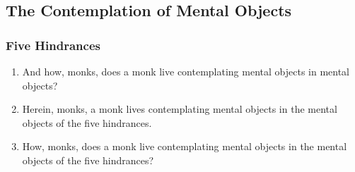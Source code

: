 \subsection*{The Contemplation of Mental Objects}
\subsubsection*{Five Hindrances}
\begin{enumerate}[resume]
\item And how, monks, does a monk live contemplating mental objects in mental objects?
\item Herein, monks, a monk lives contemplating mental objects in the mental objects of the five hindrances.
\item How, monks, does a monk live contemplating mental objects in the mental objects of the five hindrances?
\pagebreak


\end{enumerate}
